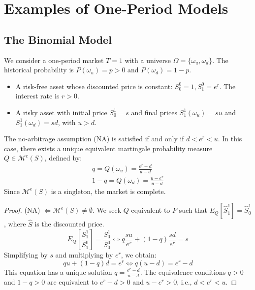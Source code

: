\chapter{Examples of One-Period Models}

\section{The Binomial Model}
We consider a one-period market $T=1$ with a universe $\Omega = \{\omega_u, \omega_d\}$. The historical probability is $P(\omega_u)=p > 0$ and $P(\omega_d)=1-p$.
\begin{itemize}
    \item A risk-free asset whose discounted price is constant: $S_0^0 = 1, S_1^0 = e^r$. The interest rate is $r > 0$.
    \item A risky asset with initial price $S_0^1=s$ and final prices $S_1^1(\omega_u) = su$ and $S_1^1(\omega_d) = sd$, with $u > d$.
\end{itemize}

\begin{proposition}
The no-arbitrage assumption (NA) is satisfied if and only if $d < e^r < u$.
In this case, there exists a unique equivalent martingale probability measure $Q \in \mathcal{M}^e(S)$, defined by:
\begin{align*}
    q = Q(\omega_u) = \frac{e^r - d}{u - d} \\
    1-q = Q(\omega_d) = \frac{u - e^r}{u - d}
\end{align*}
Since $\mathcal{M}^e(S)$ is a singleton, the market is complete.
\end{proposition}

\begin{proof}
(NA) $\iff \mathcal{M}^e(S) \neq \emptyset$. We seek $Q$ equivalent to $P$ such that $E_Q[\hat{S}_1^1] = \hat{S}_0^1$, where $\hat{S}$ is the discounted price.
\begin{equation}
E_Q\left[\frac{S_1^1}{S_1^0}\right] = \frac{S_0^1}{S_0^0} \iff q \frac{su}{e^r} + (1-q) \frac{sd}{e^r} = s
\end{equation}
Simplifying by $s$ and multiplying by $e^r$, we obtain:
\begin{equation}
q u + (1-q) d = e^r \iff q(u-d) = e^r - d
\end{equation}
This equation has a unique solution $q = \frac{e^r - d}{u - d}$. The equivalence conditions $q>0$ and $1-q>0$ are equivalent to $e^r-d>0$ and $u-e^r>0$, i.e., $d < e^r < u$.
\end{proof}

